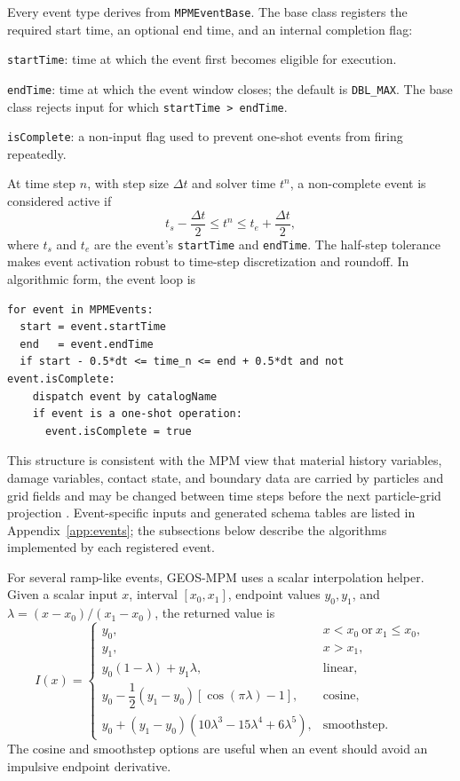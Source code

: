 Every event type derives from \texttt{MPMEventBase}.  The base class registers the required start time, an optional end time, and an internal completion flag:
\begin{description}[leftmargin=*,style=nextline]
\item[\textbf{Required input.}] \texttt{startTime}: time at which the event first becomes eligible for execution.
\item[\textbf{Optional input.}] \texttt{endTime}: time at which the event window closes; the default is \texttt{DBL\_MAX}.  The base class rejects input for which \texttt{startTime > endTime}.
\item[\textbf{Internal state.}] \texttt{isComplete}: a non-input flag used to prevent one-shot events from firing repeatedly.
\end{description}
At time step $n$, with step size $\Delta t$ and solver time $t^n$, a non-complete event is considered active if
\begin{equation}
  t_s - \frac{\Delta t}{2} \le t^n \le t_e + \frac{\Delta t}{2},
  \label{eq:event-active-window}
\end{equation}
where $t_s$ and $t_e$ are the event's \texttt{startTime} and \texttt{endTime}.  The half-step tolerance makes event activation robust to time-step discretization and roundoff.  In algorithmic form, the event loop is
\begin{lstlisting}[caption={Generic MPM event-manager loop.}]
for event in MPMEvents:
  start = event.startTime
  end   = event.endTime
  if start - 0.5*dt <= time_n <= end + 0.5*dt and not event.isComplete:
    dispatch event by catalogName
    if event is a one-shot operation:
      event.isComplete = true
\end{lstlisting}
This structure is consistent with the MPM view that material history variables, damage variables, contact state, and boundary data are carried by particles and grid fields and may be changed between time steps before the next particle-grid projection \cite{sulsky1994history,sulsky1995solid,steffen2008choices}.  Event-specific inputs and generated schema tables are listed in Appendix~\ref{app:events}; the subsections below describe the algorithms implemented by each registered event.

For several ramp-like events, GEOS-MPM uses a scalar interpolation helper.  Given a scalar input $x$, interval $[x_0,x_1]$, endpoint values $y_0,y_1$, and $\lambda=(x-x_0)/(x_1-x_0)$, the returned value is
\begin{equation}
  I(x)=
  \begin{cases}
  y_0, & x<x_0\ \text{or}\ x_1\le x_0,\\
  y_1, & x>x_1,\\
  y_0(1-\lambda)+y_1\lambda, & \text{linear},\\
  y_0 - \dfrac{1}{2}(y_1-y_0)\left[\cos(\pi\lambda)-1\right], & \text{cosine},\\
  y_0 + (y_1-y_0)\left(10\lambda^3-15\lambda^4+6\lambda^5\right), & \text{smoothstep}.
  \end{cases}
  \label{eq:event-interpolation}
\end{equation}
The cosine and smoothstep options are useful when an event should avoid an impulsive endpoint derivative.

